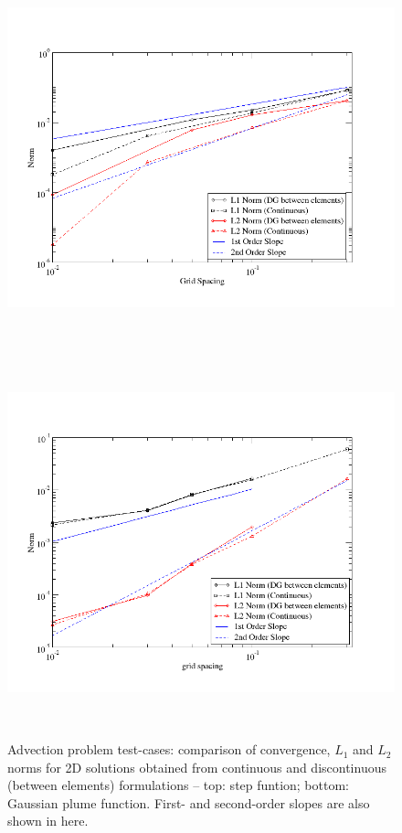 \begin{figure}[h]
\vbox{\vspace{-2.4cm}
\hbox{
\includegraphics[width=12.5cm,height=10.5cm]{./diagrams/AllNorms_Step.png}}
\vspace{-.4cm}
\hbox{
\includegraphics[width=12.5cm,height=10.5cm]{./diagrams/AllNorms2.png}}}
\caption{Advection problem test-cases: comparison of convergence, $L_{1}$ and $L_{2}$ norms for 2D solutions obtained from continuous and discontinuous (between elements) formulations -- top: step funtion; bottom: Gaussian plume function. First- and second-order slopes are also shown in here.\label{L1_L2norm_Adv2D}}
\end{figure}


